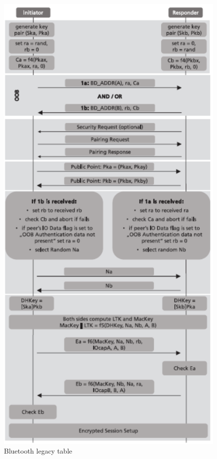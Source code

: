 \documentclass{Configuration_Files/PoliMi3i_thesis}
\begin{document}
\begin{figure}[H]
    \centering
    \includegraphics[scale=0.7]{Bluetooth_Security/8.png}
    \caption{Bluetooth legacy table \cite{casarSurveyBluetoothLow2022}}
    \label{bluetooth_sec_8}
\end{figure}
\end{document}
